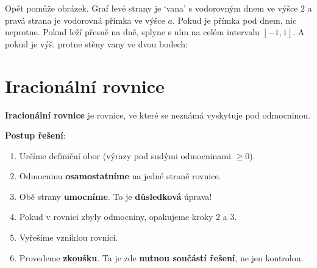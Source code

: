 Opět pomůže obrázek. Graf levé strany je `vana' s vodorovným dnem ve výšce $2$ a pravá strana je vodorovná přímka ve výšce $a$. Pokud je přímka pod dnem, nic neprotne. Pokud leží přesně na dně, splyne s ním na celém intervalu $[-1, 1]$. A pokud je výš, protne stěny vany ve dvou bodech:
\begin{center}
\end{center}

\section{Iracionální rovnice}\label{sec:iracionalni-rovnice}

\begin{definitionbox}
  \textbf{Iracionální rovnice} je rovnice, ve které se neznámá vyskytuje pod odmocninou.

  \vspace{0.2cm}

  \textbf{Postup řešení}:
  \begin{enumerate}
    \item Určíme definiční obor (výrazy pod sudými odmocninami $\geq 0$).
    \item Odmocninu \textbf{osamostatníme} na jedné straně rovnice.
    \item Obě strany \textbf{umocníme}. To je \textbf{důsledková} úprava!
    \item Pokud v rovnici zbyly odmocniny, opakujeme kroky 2 a 3.
    \item Vyřešíme vzniklou rovnici.
    \item Provedeme \textbf{zkoušku}. Ta je zde \textbf{nutnou součástí řešení}, ne jen kontrolou.
  \end{enumerate}
\end{definitionbox}

